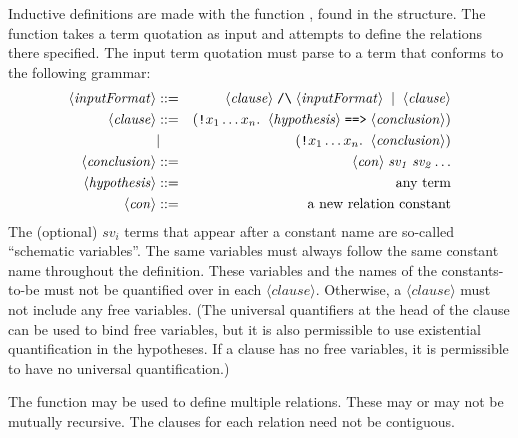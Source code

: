 Inductive definitions are made with the function , found
in the  structure.  The  function takes a
term quotation as input and attempts to define the relations there
specified.  The input term quotation must parse to a term that
conforms to the following grammar:
\newcommand{\nonterm}[1]{\ensuremath{\langle\mathit{#1}\rangle}}
\begin{eqnarray*}
   \nonterm{inputFormat} &::=& \nonterm{clause} \;\holtxt{/\bk}\; \nonterm{inputFormat} \;\;|\;\; \nonterm{clause}\\
   \nonterm{clause}       &::=& (\holtxt{!}x_1 \dots
   x_n. \;\;\nonterm{hypothesis} \;\holtxt{==>}
   \;\nonterm{conclusion})\\
   &|& (\holtxt{!}x_1\dots x_n.\;\;\nonterm{conclusion})\\
   \nonterm{conclusion}   &::=& \nonterm{con} \;\mathit{sv_1}\; \mathit{sv_2} \dots\\
   \nonterm{hypothesis}   &::=& \mbox{any term}\\
   \nonterm{con}          &::=& \mbox{a new relation constant}
\end{eqnarray*}
The (optional) $\mathit{sv}_i$ terms that appear after a constant name are
so-called ``schematic variables''.  The same variables must always
follow the same constant name throughout the definition.  These
variables and the names of the constants-to-be must not be quantified
over in each {\nonterm{clause}}.  Otherwise, a {\nonterm{clause}} must
not include any free variables.  (The universal quantifiers at the
head of the clause can be used to bind free variables, but it is also
permissible to use existential quantification in the hypotheses.  If a
clause has no free variables, it is permissible to have no universal
quantification.)

The  function may be used to define multiple relations.
These may or may not be mutually recursive.  The clauses for each
relation need not be contiguous.

